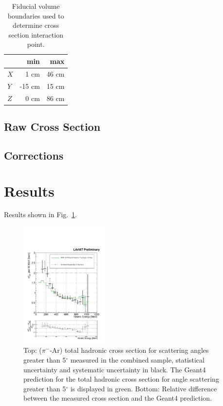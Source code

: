 \documentclass[aps,prl,twocolumn,showpacs,superscriptaddress,groupedaddress]{revtex4}  %
\begin{document}
\begin{table}[t]
\centering
\begin{tabular}{|l|r|r|}
\hline
& min   &  max  \\ \hline
$X$ & 1 cm   & 46 cm  \\ \hline
$Y$ & -15 cm   & 15  cm  \\ \hline
$Z$ & 0 cm   & 86 cm  \\ \hline
\end{tabular}
\caption{Fiducial volume boundaries used to determine cross section interaction point. }
\label{tab:FidVol}
\end{table}


\subsection{\label{sec:RawXS}Raw Cross Section}
\subsection{\label{sec:Corrections}Corrections}

\section{\label{sec:Results}Results}
Results shown in Fig.~\ref{fig:epsart}.


\begin{figure}
\includegraphics[width =0.4\textwidth ]{TheRealMoneyPlot}
\caption{\label{fig:epsart} Top: ($\pi^-$-Ar) total hadronic cross section for  scattering angles greater than 5$^\circ$ measured in the combined sample, statistical uncertainty and systematic uncertainty in black. The Geant4 prediction for the total hadronic cross section for angle scattering greater than 5$^\circ$ is displayed in green. Bottom: Relative difference between the measured cross section and the Geant4 prediction. }
\end{figure}
\end{document}
